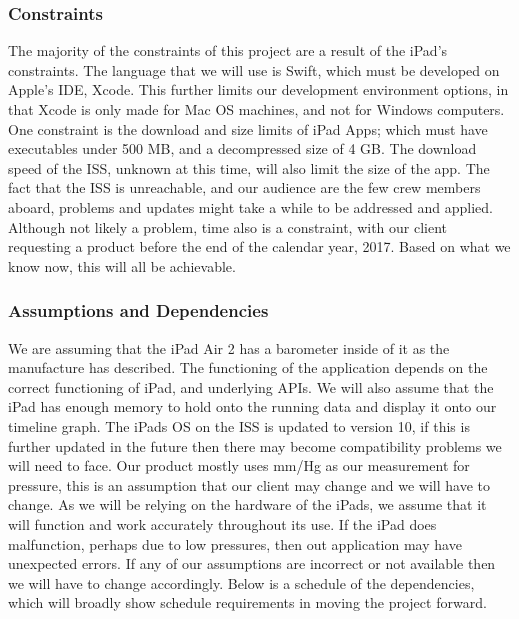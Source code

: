 \documentclass[onecolumn, draftclsnofoot,10pt, compsoc]{IEEEtran}
\begin{document}
\subsubsection{Constraints}
The majority of the constraints of this project are a result of the iPad's constraints.
The language that we will use is Swift, which must be developed on Apple's IDE, Xcode.
This further limits our development environment options, in that Xcode is only made for Mac OS machines, and not for Windows computers.
One constraint is the download and size limits of iPad Apps; which must have executables under 500 MB, and a decompressed size of 4 GB.
The download speed of the ISS, unknown at this time, will also limit the size of the app.
The fact that the ISS is unreachable, and our audience are the few crew members aboard, problems and updates might take a while to be addressed and applied.
Although not likely a problem, time also is a constraint, with our client requesting a product before the end of the calendar year, 2017.
Based on what we know now, this will all be achievable.

\subsubsection{Assumptions and Dependencies}
We are assuming that the iPad Air 2 has a barometer inside of it as the manufacture has described.
The functioning of the application depends on the correct functioning of iPad, and underlying APIs.
We will also assume that the iPad has enough memory to hold onto the running data and display it onto our timeline graph.
The iPads OS on the ISS is updated to version 10, if this is further updated in the future then there may become compatibility problems we will need to face.
Our product mostly uses mm/Hg as our measurement for pressure, this is an assumption that our client may change and we will have to change.
As we will be relying on the hardware of the iPads, we assume that it will function and work accurately throughout its use.
If the iPad does malfunction, perhaps due to low pressures, then out application may have unexpected errors.
If any of our assumptions are incorrect or not available then we will have to change accordingly.
Below is a schedule of the dependencies, which will broadly show schedule requirements in moving the project forward.
\end{document}
